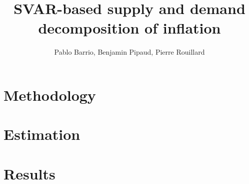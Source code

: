 \documentclass[letterpaper,12pt,leqno]{article}
\begin{document}
\title{SVAR-based supply and demand decomposition of inflation}
\author{Pablo Barrio, Benjamin Pipaud, Pierre Rouillard}
\date{}

\begin{titlepage}
\maketitle
\tableofcontents
\end{titlepage}

\section{Methodology}\label{sec:sec1}

\section{Estimation}\label{sec:sec2}
\section{Results}\label{sec:sec3}
\end{document}
